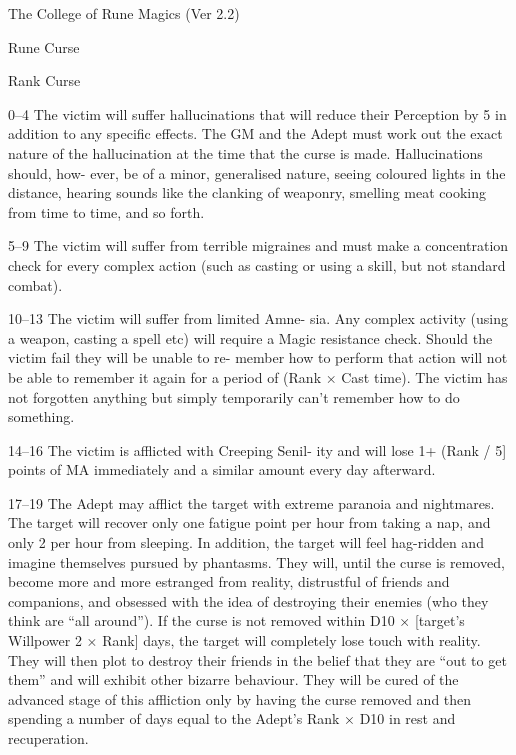 \begin{Chapter}{The College of Rune Magics (Ver 2.2)}
\begin{spell}[S-6]{Rune Curse }
\begin{effects}
Rank Curse 

0–4  The  victim  will  suffer  hallucinations  that  will 
reduce  their  Perception  by  5  in  addition  to  any 
specific effects. The GM and the Adept must work 
out the exact nature of the hallucination at the time 
that the curse is made. Hallucinations should, how-
ever,  be  of  a  minor,  generalised  nature,  seeing 
coloured lights in the distance, hearing sounds like 
the  clanking  of  weaponry,  smelling  meat  cooking 
from time to time, and so forth. 

5–9  The  victim will  suffer  from terrible  migraines 
and  must  make  a  concentration  check  for  every 
complex action (such as casting or using a skill, but 
not standard combat). 

10–13  The  victim  will  suffer  from  limited  Amne-
sia. Any complex activity (using a weapon, casting 
a  spell  etc)  will  require  a  Magic  resistance  check. 
Should  the  victim  fail  they  will  be  unable  to  re-
member how to perform that action will not be able 
to remember it again for a period of  (Rank × Cast 
time).  The  victim  has  not  forgotten  anything  but 
simply  temporarily  can’t  remember  how  to  do 
something. 

14–16 The victim is afflicted with Creeping Senil-
ity  and  will  lose  1+  (Rank  /  5]  points  of  MA  immediately  and  a  similar  amount  every  day  afterward. 



17–19  The  Adept  may  afflict  the  target  with  extreme  paranoia  and  nightmares.  The  target  will 
recover only one fatigue point per hour from taking 
a nap, and only 2 per hour from sleeping. In addition,  the  target  will  feel  hag-ridden  and  imagine 
themselves pursued by phantasms. They will, until 
the  curse  is  removed,  become  more  and  more  estranged  from  reality,  distrustful  of  friends  and 
companions, and obsessed with the idea of destroying their  enemies  (who they 
think  are  “all 
around”). If the curse is not removed within D10 × 
[target’s Willpower 2 × Rank] days, the target will 
completely  lose  touch  with  reality.  They  will  then 
plot  to  destroy  their  friends  in  the  belief  that  they 
are “out to get them” and will exhibit other bizarre 
behaviour.  They  will  be  cured  of  the  advanced 
stage  of  this  affliction  only  by  having  the  curse 
removed and then spending a number of days equal 
to  the  Adept’s  Rank  ×  D10  in  rest  and  recuperation. 



\end{effects}
\end{spell}
\end{Chapter}
